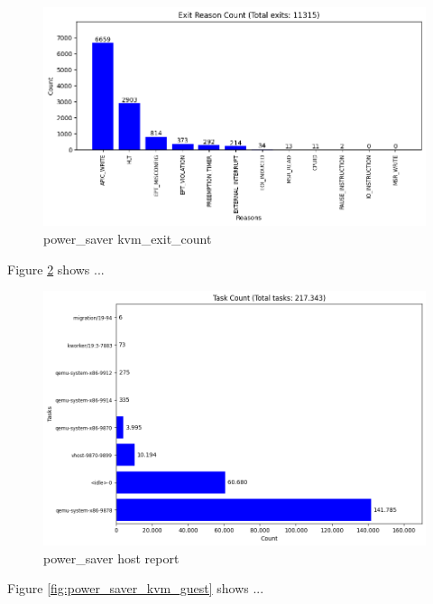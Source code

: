 \documentclass[MMR,Master,english]{twbook}
\begin{document}
\begin{figure}[H]
	\centering
	\includegraphics[width=1.0\columnwidth]{img/power_saver/kvm_exit_count.png}
	\caption[power\_saver kvm\_exit\_count]{power\_saver kvm\_exit\_count}
	\label{fig:power_saver_kvm_exit}
\end{figure}
\clearpage

Figure \ref{fig:power_saver_kvm_host} shows ...

\begin{figure}[H]
	\centering
	\includegraphics[width=1.0\columnwidth]{img/power_saver/results_host_report.png}
	\caption[power\_saver host report]{power\_saver host report}
	\label{fig:power_saver_kvm_host}
\end{figure}
\clearpage

Figure \ref{fig:power_saver_kvm_guest} shows ...
\end{document}
